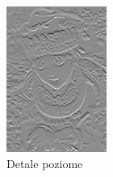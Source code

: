 \begin{figure}[ht]
    \centering

    \begin{minipage}[t]{0.3\linewidth}
        \includegraphics[width=\linewidth]{Rozdziały/02.Podstawy_teoretyczne/Obrazy/horizontal_detail.png}
        \caption{Detale poziome}
        \label{fig:image19}
    \end{minipage}
    \hspace{0.5cm}
    \begin{minipage}[t]{0.3\linewidth}

\end{minipage}
\end{figure}
